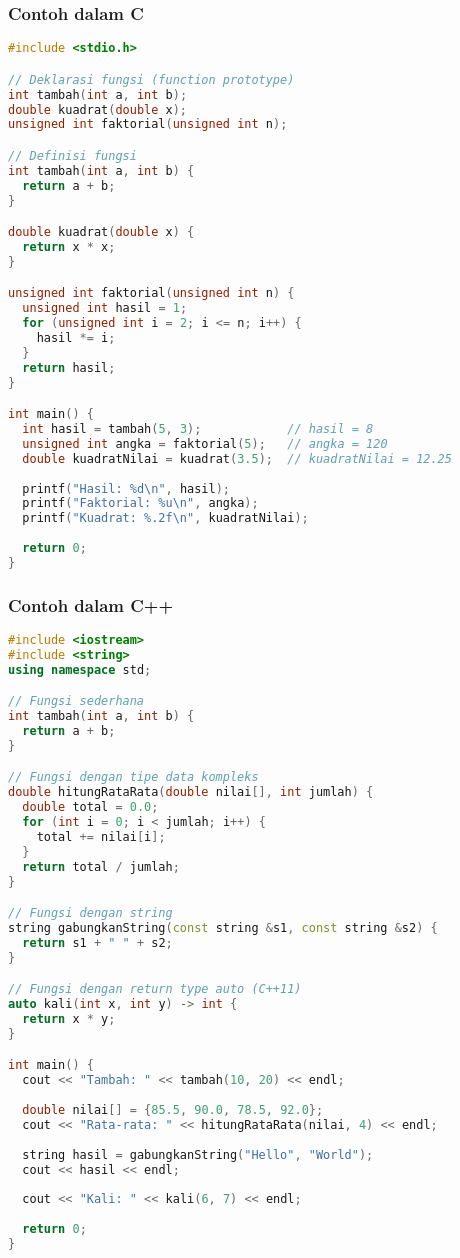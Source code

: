 \documentclass[../main.tex]{subfiles}
\begin{document}
\subsubsection{Contoh dalam C}
\begin{lstlisting}[language=C, caption={Deklarasi dan definisi fungsi (C)}]
#include <stdio.h>

// Deklarasi fungsi (function prototype)
int tambah(int a, int b);
double kuadrat(double x);
unsigned int faktorial(unsigned int n);

// Definisi fungsi
int tambah(int a, int b) {
  return a + b;
}

double kuadrat(double x) {
  return x * x;
}

unsigned int faktorial(unsigned int n) {
  unsigned int hasil = 1;
  for (unsigned int i = 2; i <= n; i++) {
    hasil *= i;
  }
  return hasil;
}

int main() {
  int hasil = tambah(5, 3);            // hasil = 8
  unsigned int angka = faktorial(5);   // angka = 120
  double kuadratNilai = kuadrat(3.5);  // kuadratNilai = 12.25
  
  printf("Hasil: %d\n", hasil);
  printf("Faktorial: %u\n", angka);
  printf("Kuadrat: %.2f\n", kuadratNilai);
  
  return 0;
}
\end{lstlisting}

\subsubsection{Contoh dalam C++}
\begin{lstlisting}[language=C++, caption={Deklarasi dan definisi fungsi (C++)}]
#include <iostream>
#include <string>
using namespace std;

// Fungsi sederhana
int tambah(int a, int b) {
  return a + b;
}

// Fungsi dengan tipe data kompleks
double hitungRataRata(double nilai[], int jumlah) {
  double total = 0.0;
  for (int i = 0; i < jumlah; i++) {
    total += nilai[i];
  }
  return total / jumlah;
}

// Fungsi dengan string
string gabungkanString(const string &s1, const string &s2) {
  return s1 + " " + s2;
}

// Fungsi dengan return type auto (C++11)
auto kali(int x, int y) -> int {
  return x * y;
}

int main() {
  cout << "Tambah: " << tambah(10, 20) << endl;
  
  double nilai[] = {85.5, 90.0, 78.5, 92.0};
  cout << "Rata-rata: " << hitungRataRata(nilai, 4) << endl;
  
  string hasil = gabungkanString("Hello", "World");
  cout << hasil << endl;
  
  cout << "Kali: " << kali(6, 7) << endl;
  
  return 0;
}
\end{lstlisting}
\end{document}
